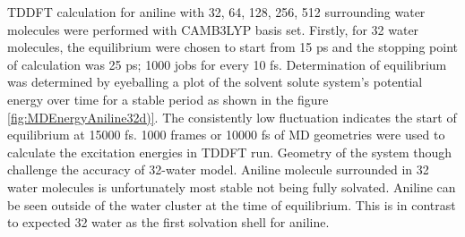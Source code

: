 \documentclass[
journal=jacsat, %
manuscript=article]{achemso}
\begin{document}
TDDFT calculation for aniline with 32, 64, 128, 256, 512 surrounding water molecules were performed with CAMB3LYP basis set. Firstly, for 32 water molecules, the equilibrium were chosen to start from 15 ps and the stopping point of calculation was 25 ps; 1000 jobs for every 10 fs. Determination of equilibrium was determined by eyeballing a plot of the solvent solute system's potential energy over time for a stable period as shown in the figure \ref{fig:MDEnergyAniline32d)}. The consistently low fluctuation indicates the start of equilibrium at 15000 fs. 1000 frames or 10000 fs of MD geometries were used to calculate the excitation energies in TDDFT run. Geometry of the system though challenge the accuracy of 32-water model. Aniline molecule surrounded in 32 water molecules is unfortunately most stable not being fully solvated. Aniline can be seen outside of the water cluster at the time of equilibrium. This is in contrast to expected 32 water as the first solvation shell for aniline. \cite{Plugatyr2009} 
\end{document}
